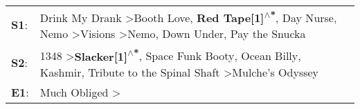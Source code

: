 \begin{supertabular}{p{0.03\textwidth}p{0.92\textwidth}}
 \textbf{S1}:  &  Drink My Drank\textsuperscript{} \textgreater \enspace Booth Love\textsuperscript{}, \enspace \textbf{Red Tape[1]\textsuperscript{$\wedge$*}}, \enspace Day Nurse\textsuperscript{}, \enspace Nemo\textsuperscript{} \textgreater \enspace Visions\textsuperscript{} \textgreater \enspace Nemo\textsuperscript{}, \enspace Down Under\textsuperscript{}, \enspace Pay the Snucka\textsuperscript{}  \enspace  \\
 \textbf{S2}:  &                                                                1348\textsuperscript{} \textgreater \enspace \textbf{Slacker[1]\textsuperscript{$\wedge$*}}, \enspace Space Funk Booty\textsuperscript{}, \enspace Ocean Billy\textsuperscript{}, \enspace Kashmir\textsuperscript{}, \enspace Tribute to the Spinal Shaft\textsuperscript{} \textgreater \enspace Mulche's Odyssey\textsuperscript{}  \enspace  \\
 \textbf{E1}:  &                                                                                                                                                                                                                                                                                                                          Much Obliged\textsuperscript{} \textgreater {}\textsuperscript{}  \enspace  \\
\end{supertabular}
